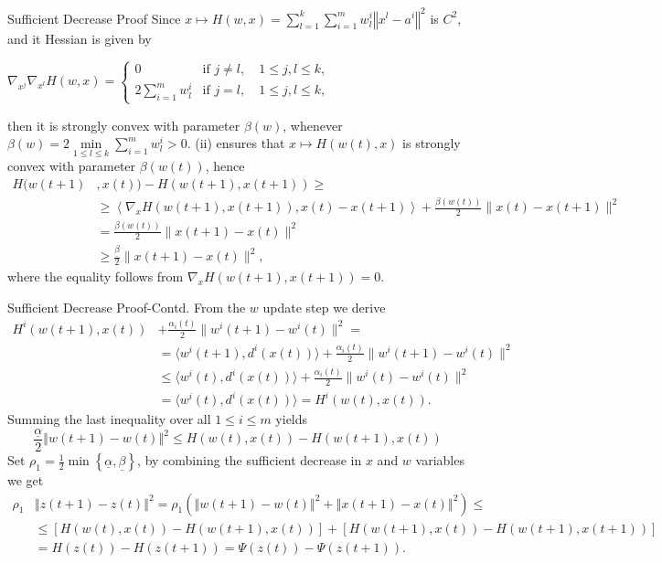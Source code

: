 \documentclass[9pt,handout]{beamer} %
\newcommand{\norm}[1]{\left\Vert {#1} \right\Vert} %
\begin{document}
	\begin{frame}{Sufficient Decrease Proof}
		Since $x \mapsto H(w,x) = \sum\limits_{l=1}^{k} \sum\limits_{i=1}^{m} w^i_l \norm{ x^l - a^i }^2$ is $C^2$, and it Hessian is given by
		\begin{center}
			$\nabla_{x^j} \nabla_{x^l} H(w,x) = 
\begin{cases} 0 &\mbox{if } j \neq l, \quad 1 \leq j,l \leq k ,
\\ 2\sum\limits_{i=1}^{m} w^i_l &\mbox{if } j = l, \quad 1 \leq j,l \leq k, \end{cases}$
		\end{center}
		then it is strongly convex with parameter $\beta(w)$, whenever $\beta(w) = 2\min\limits_{1 \leq l \leq k} \sum\limits_{i=1}^{m} w^i_l >0$.
		(ii) ensures that $x \mapsto H(w(t),x)$ is strongly convex with parameter $\beta(w(t))$, hence
		\begin{align*}
			H(w(t+1)&,x(t))  - H(w(t+1),x(t+1)) \geq \\
			& \geq \left\langle \nabla_x H(w(t+1),x(t+1)) , x(t)-x(t+1) \right\rangle + \frac{\beta(w(t))}{2} \|x(t) - x(t+1)\|^2 \\
			& = \frac{\beta(w(t))}{2} \|x(t+1) - x(t)\|^2  \\
			& \geq \frac{\underline{\beta}}{2} \|x(t+1) - x(t)\|^2,
		\end{align*}
		where the equality follows from $\nabla_{x} H(w(t+1), x(t+1)) = 0$.
	\end{frame}
	
	\begin{frame}{Sufficient Decrease Proof-Contd.}
		From the $w$ update step we derive
		\begin{align*}
			H^i(w(t+1),x(t)) &+ \frac{\alpha_i(t)}{2} \|w^i(t+1) - w^i(t)\|^2 = \\
			& = \langle w^i(t+1) , d^i(x(t)) \rangle + \frac{\alpha_i(t)}{2} \|w^i(t+1) - w^i(t)\|^2 \\
			& \leq \langle w^i(t) , d^i(x(t)) \rangle + \frac{\alpha_i(t)}{2} \|w^i(t) - w^i(t)\|^2 \\
			& = \langle w^i(t) , d^i(x(t)) \rangle = H^i(w(t),x(t)) .
		\end{align*}
		Summing the last inequality over all $1 \leq i \leq m$ yields
		\begin{equation*}
			\frac{\underline{\alpha}}{2} \norm{w(t+1) - w(t)}^2 
			\leq H(w(t),x(t)) - H(w(t+1),x(t))
		\end{equation*}
		Set $\rho_1 = \frac{1}{2}\min\left\lbrace \underline{\alpha} , \underline{\beta} \right\rbrace$, by combining the sufficient decrease in $x$ and $w$ variables we get
		\begin{align*}
			\rho_1 &\norm{z(t+1) - z(t)}^2 
			= \rho_1 \left( \norm{w(t+1) - w(t)}^2 + \norm{x(t+1) - x(t)}^2  \right) \leq \\
			&\leq \left[ H(w(t),x(t)) - H(w(t+1),x(t)) \right] + \left[ H(w(t+1),x(t)) - H(w(t+1),x(t+1)) \right] \\
			&= H(z(t)) - H(z(t+1)) = \Psi(z(t)) - \Psi(z(t+1)).
		\end{align*}
	\end{frame}
	
\end{document}
